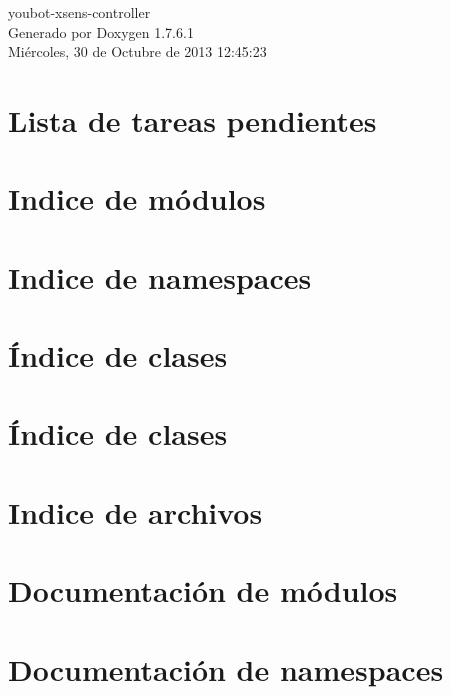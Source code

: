\documentclass[a4paper]{book}
\begin{document}
\hypersetup{pageanchor=false,citecolor=blue}
\begin{titlepage}
\vspace*{7cm}
\begin{center}
{\Large youbot-\/xsens-\/controller }\\
\vspace*{1cm}
{\large \-Generado por Doxygen 1.7.6.1}\\
\vspace*{0.5cm}
{\small Miércoles, 30 de Octubre de 2013 12:45:23}\\
\end{center}
\end{titlepage}
\clearemptydoublepage
{}
\tableofcontents
\clearemptydoublepage
{}
\hypersetup{pageanchor=true,citecolor=blue}
\chapter{\-Lista de tareas pendientes}
\label{todo}
\hypertarget{todo}{}

\chapter{\-Indice de módulos}

\chapter{\-Indice de namespaces}

\chapter{Índice de clases}

\chapter{Índice de clases}

\chapter{\-Indice de archivos}

\chapter{\-Documentación de módulos}

\chapter{\-Documentación de namespaces}


\end{document}

